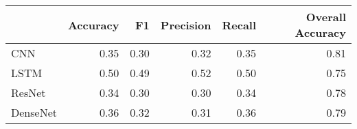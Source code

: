 \begin{tabular}{lrrrrr}
\toprule
{} &  Accuracy &    F1 &  Precision &  Recall &  Overall Accuracy \\
\midrule
CNN      &      0.35 &  0.30 &       0.32 &    0.35 &              0.81 \\
LSTM     &      0.50 &  0.49 &       0.52 &    0.50 &              0.75 \\
ResNet   &      0.34 &  0.30 &       0.30 &    0.34 &              0.78 \\
DenseNet &      0.36 &  0.32 &       0.31 &    0.36 &              0.79 \\
\bottomrule
\end{tabular}

